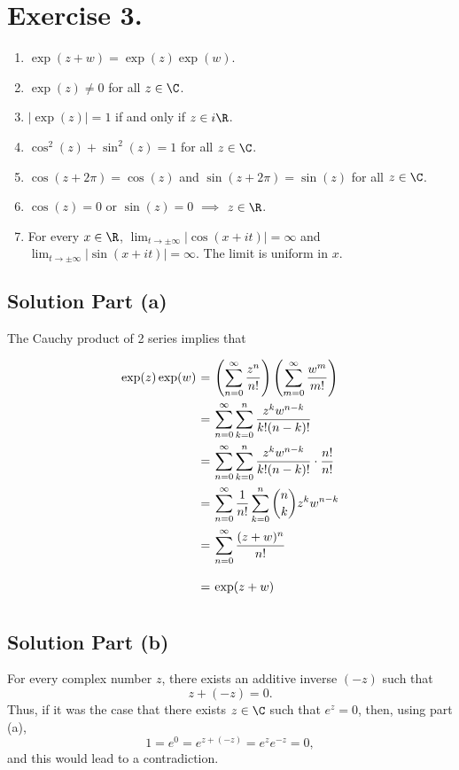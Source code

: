 \section*{Exercise 3.}

\begin{enumerate}[label=(\alph*)]
    \item $\exp(z+w) = \exp(z) \exp(w)$.
    \item $\exp(z) \neq 0$ for all $z\in\C$.
    \item $|\exp(z)| = 1$ if and only if $z\in i\R$.
    \item $\cos^2(z)+\sin^2(z) = 1$ for all $z \in \C$.
    \item $\cos(z+ 2\pi) = \cos(z)$ and $\sin(z+2\pi) = \sin(z)$ for all $z \in \C$.
    \item $\cos(z) = 0$ or $\sin(z) = 0$ $\implies$ $z\in\R$.
    \item For every $x\in\R$, $\lim_{t\to\pm\infty}|\cos(x+it)| = \infty $ and $\lim_{t\to\pm\infty}|\sin(x+it)| = \infty $. The limit is uniform in $x$.
\end{enumerate}

\subsection*{Solution Part (a)}
The Cauchy product of 2 series implies that
\[ \everymath{\displaystyle}
\arraycolsep=1.8pt\def\arraystretch{2.5}
\begin{array}{rcl}
    \exp (z) \exp (w) & = & \left( \sum_{n = 0}^{\infty} \frac{z^n}{n!} \right) \left( \sum_{m = 0}^{\infty} \frac{w^m}{m!} \right)\\
    & = & \sum_{n = 0}^{\infty} \sum_{k = 0}^n \frac{z^k w^{n-k}}{k!(n-k)!}\\
    & = & \sum_{n = 0}^{\infty} \sum_{k = 0}^n \frac{z^k w^{n-k}}{k!(n-k)!} \cdot \frac{n!}{n!}\\
    & = & \sum_{n = 0}^{\infty} \frac{1}{n!} \sum_{k = 0}^n \binom{n}{k} z^k w^{n-k}\\
    & = & \sum_{n = 0}^{\infty} \frac{(z+w)^n}{n!}\\
    & = & \exp(z+w)
\end{array} \]

\subsection*{Solution Part (b)}

For every complex number $z$, there exists an additive inverse $(-z)$ such that
\[ z + (-z) = 0. \]
Thus, if it was the case that there exists $z\in \C$ such that $e^z = 0$, then, using part (a),
\[ 1 = e^0 = e^{z + (-z)} = e^{z} e^{-z} = 0, \]
and this would lead to a contradiction.

